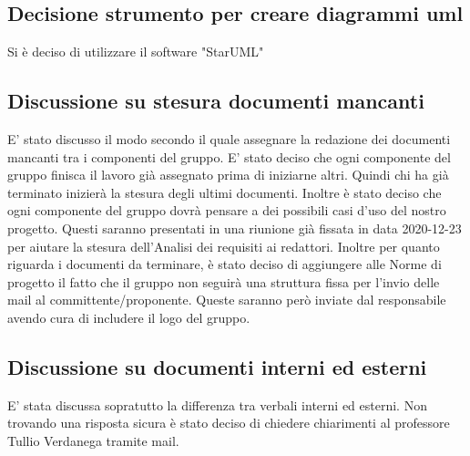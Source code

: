 \subsection*{Decisione strumento per creare diagrammi uml}
Si è deciso di utilizzare il software "StarUML"

\subsection*{Discussione su stesura documenti mancanti}
E' stato discusso il modo secondo il quale assegnare la redazione dei documenti mancanti tra i componenti del gruppo. 
E' stato deciso che ogni componente del gruppo finisca il lavoro già assegnato prima di iniziarne altri. Quindi chi ha già terminato inizierà la stesura degli ultimi documenti. 
Inoltre è stato deciso che ogni componente del gruppo dovrà pensare a dei possibili casi d'uso del nostro progetto. Questi saranno presentati in una riunione già fissata in data 2020-12-23 per aiutare la stesura dell'Analisi dei requisiti ai redattori. 
Inoltre per quanto riguarda i documenti da terminare, è stato deciso di aggiungere alle Norme di progetto il fatto che il gruppo non seguirà una struttura fissa per l'invio delle mail al committente/proponente. Queste saranno però inviate dal responsabile avendo cura di includere il logo del gruppo.

\subsection*{Discussione su documenti interni ed esterni}
E' stata discussa sopratutto la differenza tra verbali interni ed esterni. Non trovando una risposta sicura è stato deciso di chiedere chiarimenti al professore Tullio Verdanega tramite mail.		


			





